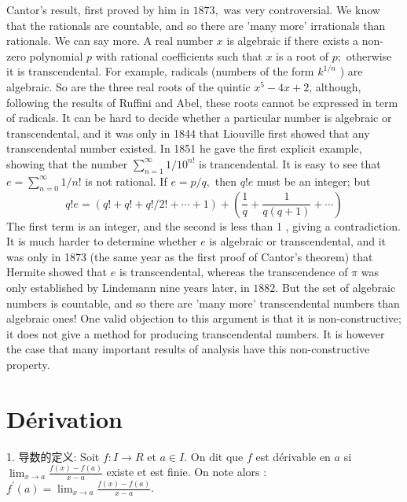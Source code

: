 \documentclass[12pt]{book}
\theoremstyle{definition}\newtheorem{dfn}{Définition}[chapter]
\theoremstyle{plain}\newtheorem{thm}{Théorème}[chapter]
\theoremstyle{plain}\newtheorem{prp}{Proposition}[chapter]
\theoremstyle{plain}\newtheorem{lem}{\bf Lemme}[chapter]
\theoremstyle{plain}\newtheorem{axm}{\bf Axiome}[chapter]
\theoremstyle{plain}\newtheorem{lmm}{\bf Lemme}[chapter]
\theoremstyle{plain}\newtheorem{exm}{\bf Example}[chapter]
\theoremstyle{plain}\newtheorem{cor}{\bf Corollaire}[chapter]
\theoremstyle{remark}\newtheorem{rem}{Remarque}[chapter]
\begin{document}
Cantor's result, first proved by him in $1873,$ was very controversial. We know that the rationals are countable, and so there are 'many more' irrationals than rationals. We can say more. A real number $x$ is algebraic if there exists a non-zero polynomial $p$ with rational coefficients such that $x$ is a root of $p ;$ otherwise it is transcendental. For example, radicals (numbers of the form $k^{1 / n}$ ) are algebraic. So are the three real roots of the quintic $x^{5}-4 x+2$, although, following the results of Ruffini and Abel, these roots cannot be expressed in term of radicals. It can be hard to decide whether a particular number is algebraic or transcendental, and it was only in 1844 that Liouville first showed that any transcendental number existed. In 1851 he gave the first explicit example, showing that the number $\sum_{n=1}^{\infty} 1 / 10^{n !}$ is trancendental. It is easy to see that $e=\sum_{n=0}^{\infty} 1 / n !$ is not rational. If $e=p / q,$ then $q ! e$ must be an integer; but
$$
q ! e=(q !+q !+q ! / 2 !+\cdots+1)+\left(\frac{1}{q}+\frac{1}{q(q+1)}+\cdots\right)
$$
The first term is an integer, and the second is less than 1 , giving a contradiction. It is much harder to determine whether $e$ is algebraic or transcendental, and it was only in 1873 (the same year as the first proof of Cantor's theorem) that Hermite showed that $e$ is transcendental, whereas the transcendence of $\pi$ was only established by Lindemann nine years later, in $1882 .$ But the set of algebraic numbers is countable, and so there are 'many more' transcendental numbers than algebraic ones! One valid objection to this argument is that it is non-constructive; it does not give a method for producing transcendental numbers. It is however the case that many important results of analysis have this non-constructive property.
















\chapter{Dérivation}
1. 导数的定义: Soit $f: I \longrightarrow R$ et $a \in I .$ On dit que $f$ est dérivable en $a$ si $\lim _{x \rightarrow a} \frac{f(x)-f(a)}{x-a}$ existe et est finie. On note alors : $f^{\prime}(a)=\lim _{x \rightarrow a} \frac{f(x)-f(a)}{x-a}$.
\end{document}
